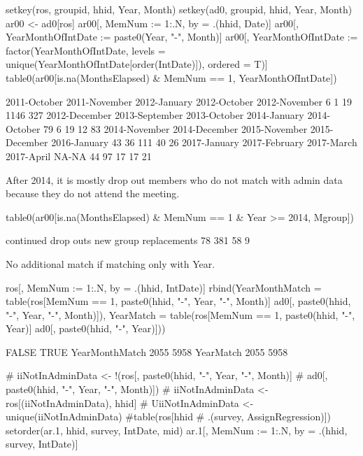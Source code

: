 \begin{Schunk}
\begin{Sinput}
setkey(ros, groupid, hhid, Year, Month)
setkey(ad0, groupid, hhid, Year, Month)
ar00 <- ad0[ros]
ar00[, MemNum := 1:.N, by = .(hhid, Date)]
ar00[, YearMonthOfIntDate := paste0(Year, "-", Month)]
ar00[, YearMonthOfIntDate := factor(YearMonthOfIntDate, 
  levels = unique(YearMonthOfIntDate[order(IntDate)]), ordered = T)]
table0(ar00[is.na(MonthsElapsed) & MemNum == 1, 
  YearMonthOfIntDate])
\end{Sinput}
\begin{Soutput}

  2011-October  2011-November   2012-January   2012-October  2012-November 
             6              1             19           1146            327 
 2012-December 2013-September   2013-October   2014-January   2014-October 
            79              6             19             12             83 
 2014-November  2014-December  2015-November  2015-December   2016-January 
            43             36            111             40             26 
  2017-January  2017-February     2017-March     2017-April          NA-NA 
            44             97             17             17             21 
\end{Soutput}
\end{Schunk}
After 2014, it is mostly drop out members who do not match with admin data because they do not attend the meeting.
\begin{Schunk}
\begin{Sinput}
table0(ar00[is.na(MonthsElapsed) & MemNum == 1 & Year >= 2014, 
  Mgroup])
\end{Sinput}
\begin{Soutput}

   continued    drop outs    new group replacements 
          78          381           58            9 
\end{Soutput}
\end{Schunk}
No additional match if matching only with \textsf{Year}. 
\begin{Schunk}
\begin{Sinput}
ros[, MemNum := 1:.N, by = .(hhid, IntDate)]
rbind(YearMonthMatch = table(ros[MemNum == 1, paste0(hhid, "-", Year, "-", Month)] %in% 
    ad0[, paste0(hhid, "-", Year, "-", Month)]), 
  YearMatch = table(ros[MemNum == 1, paste0(hhid, "-", Year)] %in% 
    ad0[, paste0(hhid, "-", Year)]))
\end{Sinput}
\begin{Soutput}
               FALSE TRUE
YearMonthMatch  2055 5958
YearMatch       2055 5958
\end{Soutput}
\begin{Sinput}
# iiNotInAdminData <- !(ros[, paste0(hhid, "-", Year, "-", Month)] %in% 
#   ad0[, paste0(hhid, "-", Year, "-", Month)])
# iiNotInAdminData <- ros[(iiNotInAdminData), hhid]
# UiiNotInAdminData <- unique(iiNotInAdminData)
#table(ros[hhid %in% iiNotInAdminData & MemNum == 1, 
#  .(survey, AssignRegression)])
setorder(ar.1, hhid, survey, IntDate, mid)
ar.1[, MemNum := 1:.N, by = .(hhid, survey, IntDate)]
\end{Sinput}
\end{Schunk}
